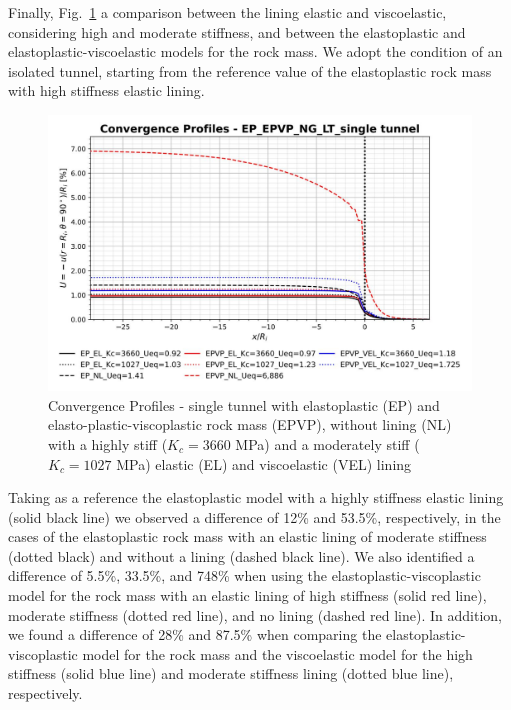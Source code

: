 \documentclass[a4paper,fleqn]{cas-sc}
\begin{document}
Finally, Fig.~\ref{EP_EPVP_NG_LT_single tunnel} a comparison between the lining elastic and viscoelastic, considering high and moderate stiffness, and between the elastoplastic and elastoplastic-viscoelastic models for the rock mass. We adopt the condition of an isolated tunnel, starting from the reference value of the elastoplastic rock mass with high stiffness elastic lining. 

\begin{figure}[h!]
	\centering
	\includegraphics[scale=0.5]{Convergence Profiles - EP_EPVP_NG_LT_single tunnel.pdf}
	\caption{Convergence Profiles - single tunnel with elastoplastic (EP) and elasto-plastic-viscoplastic rock mass (EPVP), without lining (NL) with a highly stiff ($K_c = 3660$ MPa) and a moderately stiff ($K_c = 1027$ MPa) elastic (EL) and viscoelastic (VEL) lining}
	\label{EP_EPVP_NG_LT_single tunnel}
\end{figure}
\FloatBarrier

Taking as a reference the elastoplastic model with a highly stiffness elastic lining (solid black line) we observed a difference of 12\% and 53.5\%, respectively, in the cases of the elastoplastic rock mass with an elastic lining of moderate stiffness (dotted black) and without a lining (dashed black line). We also identified a difference of 5.5\%, 33.5\%, and 748\% when using the elastoplastic-viscoplastic model for the rock mass with an elastic lining of high stiffness (solid red line), moderate stiffness (dotted red line), and no lining (dashed red line). In addition, we found a difference of 28\% and 87.5\% when comparing the elastoplastic-viscoplastic model for the rock mass and the viscoelastic model for the high stiffness (solid blue line) and moderate stiffness lining (dotted blue line), respectively.
\end{document}
